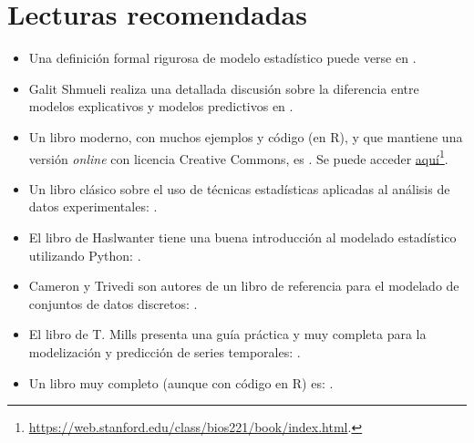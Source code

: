 \section{Lecturas recomendadas}
\begin{itemize}
 \item Una definición formal rigurosa de modelo estadístico puede verse en .
 \item Galit Shmueli realiza una detallada discusión sobre la diferencia entre modelos explicativos 
y modelos predictivos en .
 \item Un libro moderno, con muchos ejemplos y código (en R), y que mantiene una versión 
\textit{online} con licencia Creative Commons, es . Se puede acceder \href{https://web.stanford.edu/class/bios221/book/index.html}{aquí}\footnote{\url{https://web.stanford.edu/class/bios221/book/index.html}.}.
\item Un libro clásico sobre el uso de técnicas estadísticas aplicadas al análisis de datos experimentales: .
\item El libro de Haslwanter tiene una buena introducción al modelado estadístico utilizando Python: .
\item Cameron y Trivedi son autores de un libro de referencia para el modelado de conjuntos de datos discretos: .
\item El libro de T. Mills presenta una guía práctica y muy completa para la modelización y predicción de series temporales: .
\item Un libro muy completo (aunque con código en R) es: .
\end{itemize}
